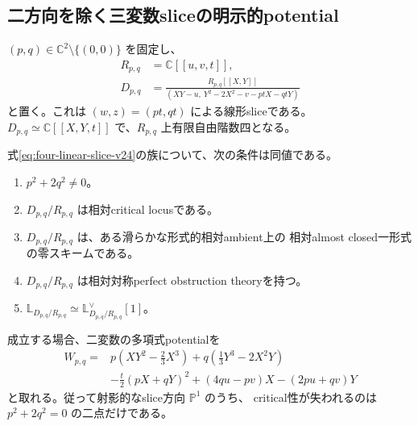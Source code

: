 \subsection{二方向を除く三変数sliceの明示的potential}

$(p,q)\in\mathbb C^2\setminus\{(0,0)\}$ を固定し、
\begin{align}
 R_{p,q}&=\mathbb C[[u,v,t]],\\
 D_{p,q}&=\frac{R_{p,q}[[X,Y]]}
 {(XY-u,\ Y^2-2X^2-v-ptX-qtY)}
 \label{eq:four-linear-slice-v24}
\end{align}
と置く。これは $(w,z)=(pt,qt)$ による線形sliceである。
$D_{p,q}\simeq\mathbb C[[X,Y,t]]$ で、$R_{p,q}$ 上有限自由階数四となる。

\begin{theorem}\label{thm:four-critical-slices-v24}
式\eqref{eq:four-linear-slice-v24}の族について、次の条件は同値である。
\begin{enumerate}
\item $p^2+2q^2\ne0$。
\item $D_{p,q}/R_{p,q}$ は相対critical locusである。
\item $D_{p,q}/R_{p,q}$ は、ある滑らかな形式的相対ambient上の
相対almost closed一形式の零スキームである。
\item $D_{p,q}/R_{p,q}$ は相対対称perfect obstruction theoryを持つ。
\item $\mathbb L_{D_{p,q}/R_{p,q}}\simeq
\mathbb L_{D_{p,q}/R_{p,q}}^\vee[1]$。
\end{enumerate}
成立する場合、二変数の多項式potentialを
\begin{align}
 W_{p,q}={}&p\left(XY^2-\frac23X^3\right)
 +q\left(\frac13Y^3-2X^2Y\right)\nonumber\\
 &-\frac t2(pX+qY)^2
 +(4qu-pv)X-(2pu+qv)Y
 \label{eq:four-slice-potential-v24}
\end{align}
と取れる。従って射影的なslice方向 $\mathbb P^1$ のうち、
critical性が失われるのは $p^2+2q^2=0$ の二点だけである。
\end{theorem}

